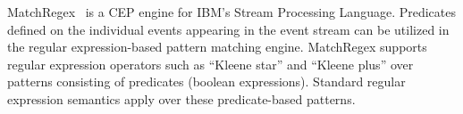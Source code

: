MatchRegex~\cite{DBLP:conf/debs/Hirzel12} is a CEP engine for IBM’s Stream Processing
Language. Predicates defined on the individual events appearing in the event
stream can be utilized in the regular expression-based pattern matching
engine. MatchRegex supports regular expression operators such as “Kleene star”
and “Kleene plus” over patterns consisting of predicates (boolean expressions).
Standard regular expression semantics apply over these predicate-based patterns.

